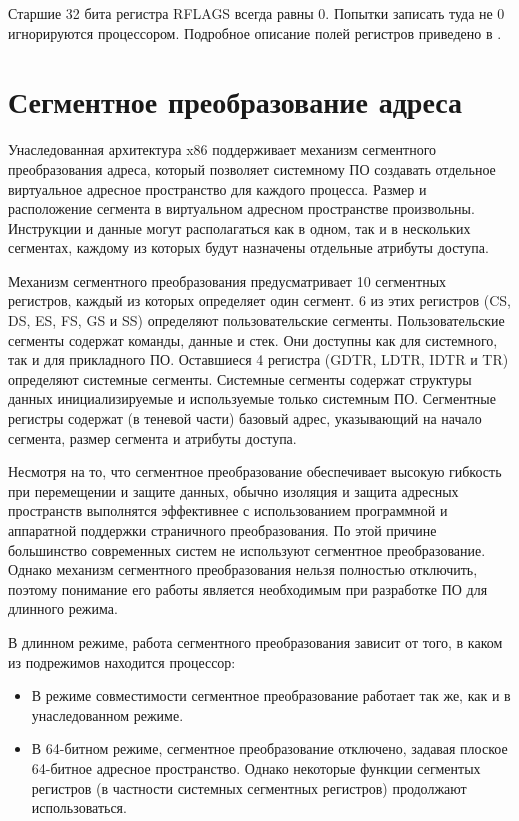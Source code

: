 Старшие 32 бита регистра RFLAGS всегда равны 0. Попытки записать туда не 0 игнорируются процессором.
Подробное описание полей регистров приведено в \cite[стр. 42]{amd_pm_v2}.

\section{Сегментное преобразование адреса}
Унаследованная архитектура x86 поддерживает механизм сегментного преобразования адреса, который
позволяет системному ПО создавать отдельное виртуальное адресное пространство для каждого процесса.
Размер и расположение сегмента в виртуальном адресном пространстве произвольны. Инструкции и данные
могут располагаться как в одном, так и в нескольких сегментах, каждому из которых будут назначены
отдельные атрибуты доступа.

Механизм сегментного преобразования предусматривает 10 сегментных регистров, каждый из которых
определяет один сегмент. 6 из этих регистров (CS, DS, ES, FS, GS и SS) определяют пользовательские сегменты.
Пользовательские сегменты содержат команды, данные и стек. Они доступны как для системного, так и для прикладного ПО.
Оставшиеся 4 регистра (GDTR, LDTR, IDTR и TR) определяют системные сегменты. Системные сегменты содержат структуры
данных инициализируемые и используемые только системным ПО. Сегментные регистры содержат (в теневой части)
базовый адрес, указывающий на начало сегмента, размер сегмента и атрибуты доступа.

Несмотря на то, что сегментное преобразование обеспечивает высокую гибкость при перемещении и защите данных,
обычно изоляция и защита адресных пространств выполнятся эффективнее с использованием программной и аппаратной
поддержки страничного преобразования. По этой причине большинство современных систем не используют сегментное преобразование.
Однако механизм сегментного преобразования нельзя полностью отключить, поэтому понимание его работы
является необходимым при разработке ПО для длинного режима.

В длинном режиме, работа сегментного преобразования зависит от того, в каком из подрежимов находится процессор:
\begin{itemize}
\item В режиме совместимости сегментное преобразование работает так же, как и в унаследованном режиме.
\item В 64-битном режиме, сегментное преобразование отключено, задавая плоское 64-битное адресное пространство.
	Однако некоторые функции сегментых регистров (в частности системных сегментных регистров) продолжают использоваться.
\end{itemize}

